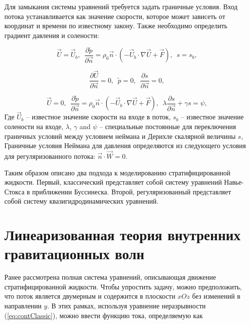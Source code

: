 Для замыкания системы уравнений требуется задать граничные условия. Вход потока устанавливается как значение скорости, которое может зависеть от координат и времени по известному закону. Также необходимо определить градиент давления и солености:



\begin{equation}\label{eq:qhd_inlet}
    \vec{U} = \vec{U}_b, \,\,\, \frac{\partial \tilde p}{ \partial \vec{n}} = \rho_0 \vec n \cdot \left ( -\vec U_b \cdot \nabla \vec U + \vec F \right), \,\,\, s = s_b,
\end{equation}  

\begin{equation}\label{eq:qhd_outlet}
        \frac{\partial \vec{U}}{\partial \vec{n}} = 0, \,\,\, \tilde p = 0, \,\,\, \frac{\partial s}{ \partial \vec{n}} = 0,
\end{equation}

\begin{equation}\label{eq:qhd_walls}
        \vec{U} = 0, \,\,\, \frac{\partial \tilde p}{ \partial \vec{n}} = \rho_0 \vec n \cdot \left ( -\vec U_b \cdot \nabla \vec U + \vec F \right), \,\,\, \lambda \frac{\partial s}{ \partial \vec{n}} + \gamma s = \psi,
\end{equation}
Где $\vec U_b$ -- известное значение скорости на входе в поток,
$s_b$ -- известное значение солености на входе,
$\lambda$, $\gamma$ and $\psi$ -- специальные постоянные для переключения граничных условий между условием неймана и Дерихле скалярной величины $s$,
Граничные условия Неймана для давления определяются из следующего условия для регуляризованного потока:
$\vec n \cdot \vec W = 0$.


Таким образом описано два подхода к моделированию стратифицированной жидкости. Первый, классический представляет собой систему уравнений Навье-Стокса в приближении Буссинеска. Второй, регуляризованный представляет собой систему квазигидродинамических уравнений. 

\section{Линеаризованная теория внутренних гравитационных волн}

Ранее рассмотрена полная система уравнений, описывающая движение стратифицированной жидкости. Чтобы упростить задачу, можно предположить, что поток является двумерным и содержится в плоскости $xOz$ без изменений в направлении $y$. В этих рамках, используя уравнение неразрывности (\ref{eq:contClassic}), можно ввести функцию тока, определяемую как

